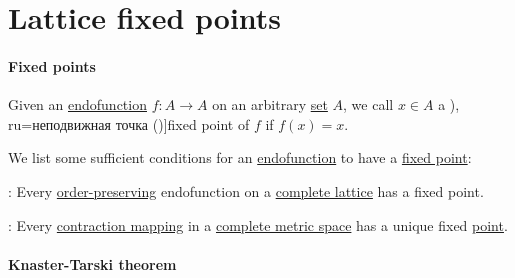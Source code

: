\section{Lattice fixed points}\label{sec:lattice_fixed_points}

\paragraph{Fixed points}

\begin{definition}\label{def:fixed_point}
  Given an \hyperref[def:function/endofunction]{endofunction} \( f: A \to A \) on an arbitrary \hyperref[def:set]{set} \( A \), we call \( x \in A \) a \term[bg=неподвижна точка (\cite[138]{Боянов2008ЧислениМетоди}), ru=неподвижная точка (\cite[\S 1.8.6]{Новиков2013ДискретнаяМатематика})]{fixed point} of \( f \) if \( f(x) = x \).
\end{definition}

\begin{theorem}\label{thm:fixed_point_existence}
  We list some sufficient conditions for an \hyperref[def:function/endofunction]{endofunction} to have a \hyperref[def:fixed_point]{fixed point}:
  \begin{thmenum}
     : Every \hyperref[def:order_function]{order-preserving} endofunction on a \hyperref[def:complete_lattice]{complete lattice} has a fixed point.

     : Every \hyperref[def:lipschitz_continuity/contraction]{contraction mapping} in a \hyperref[def:complete_metric_space]{complete metric space} has a unique fixed \hyperref[def:fixed_point]{point}.
  \end{thmenum}
\end{theorem}

\paragraph{Knaster-Tarski theorem}


